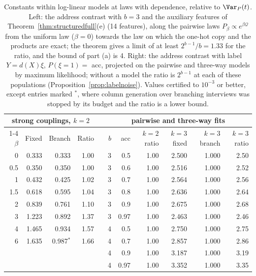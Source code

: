 \begin{table}[h]
\centering
\caption{Constants within log-linear models at laws with dependence, relative to $\Var_P(t)$. Left: the address contrast with $b=3$ and the auxiliary features of Theorem~\ref{thm:structuredfull}(e) (14 features), along the pairwise laws $P_\beta\propto e^{\beta\mathcal Q}$ from the uniform law ($\beta=0$) towards the law on which the one-hot copy and the products are exact; the theorem gives a limit of at least $2^{b-1}/b=1.33$ for the ratio, and the bound of part (a) is 4. Right: the address contrast with label $Y=d(X)\xi$, $P(\xi=1)=$ acc, projected on the pairwise and three-way models by maximum likelihood; without a model the ratio is $2^{b-1}$ at each of these populations (Proposition~\ref{prop:labelnoise}). Values certified to $10^{-3}$ or better, except entries marked $^\ast$, where column generation over branching interviews was stopped by its budget and the ratio is a lower bound.}
\label{tab:dependence}
\small
\setlength{\tabcolsep}{4pt}
\begin{tabular}{rrrr c rrrrrr}
\toprule
\multicolumn{4}{c}{strong couplings, $k=2$} & & \multicolumn{6}{c}{pairwise and three-way fits} \\
\cmidrule{1-4}\cmidrule{6-11}
$\beta$ & Fixed & Branch & Ratio & & $b$ & acc & $k=2$ ratio & $k=3$ fixed & $k=3$ branch & $k=3$ ratio \\
\midrule
0 & 0.333 & 0.333 & 1.00 & & 3 & 0.5 & 1.00 & 2.500 & 1.000 & 2.50 \\
0.5 & 0.350 & 0.350 & 1.00 & & 3 & 0.6 & 1.00 & 2.516 & 1.000 & 2.52 \\
1 & 0.432 & 0.425 & 1.02 & & 3 & 0.7 & 1.00 & 2.564 & 1.000 & 2.56 \\
1.5 & 0.618 & 0.595 & 1.04 & & 3 & 0.8 & 1.00 & 2.636 & 1.000 & 2.64 \\
2 & 0.839 & 0.761 & 1.10 & & 3 & 0.9 & 1.00 & 2.675 & 1.000 & 2.68 \\
3 & 1.223 & 0.892 & 1.37 & & 3 & 0.97 & 1.00 & 2.463 & 1.000 & 2.46 \\
4 & 1.465 & 0.934 & 1.57 & & 4 & 0.5 & 1.00 & 2.750 & 1.000 & 2.75 \\
6 & 1.635 & 0.987$^\ast$ & 1.66 & & 4 & 0.7 & 1.00 & 2.857 & 1.000 & 2.86 \\
 & & &  & & 4 & 0.9 & 1.00 & 3.187 & 1.000 & 3.19 \\
 & & &  & & 4 & 0.97 & 1.00 & 3.352 & 1.000 & 3.35 \\
\bottomrule
\end{tabular}
\end{table}
